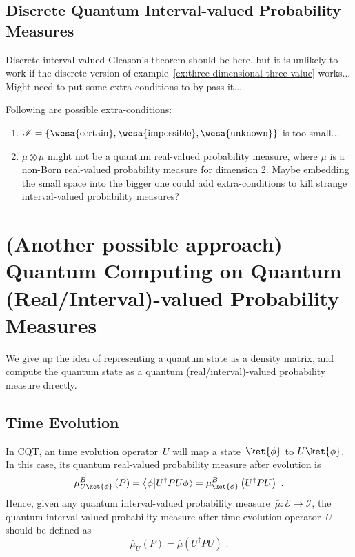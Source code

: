 \documentclass{article}
\theoremstyle{remark}
\newcommand{\events}{\ensuremath{\mathcal{E}}}
\newcommand{\imposs}{{\mbox{\wesa{impossible}}}}
\newcommand{\necess}{{\mbox{\wesa{certain}}}}
\newcommand{\unknown}{{\mbox{\wesa{unknown}}}}
\newcommand{\ip}[2]{\ensuremath{\left\langle{#1}\middle\vert{#2}\right\rangle}}
\begin{document}
\subsection{Discrete Quantum Interval-valued Probability Measures}

Discrete interval-valued Gleason's theorem should be here, but it
is unlikely to work if the discrete version of example~\ref{ex:three-dimensional-three-value}
works... Might need to put some extra-conditions to by-pass it...

Following are possible extra-conditions:
\begin{enumerate}
\item \emph{$\mathscr{I}=\left\{ \necess,\imposs,\unknown\right\} $} is
too small...
\item $\mu\otimes\mu$ might not be a quantum real-valued probability measure,
where $\mu$ is a non-Born real-valued probability measure for dimension
2. Maybe embedding the small space into the bigger one could add extra-conditions
to kill strange interval-valued probability measures?
\end{enumerate}

\section{\label{sec:QC}(Another possible approach) Quantum Computing on Quantum
(Real/Interval)-valued Probability Measures}

We give up the idea of representing a quantum state as a density matrix,
and compute the quantum state as a quantum (real/interval)-valued
probability measure directly. 



\subsection{Time Evolution}

In CQT, an time evolution operator~$U$ will map a state~$\ket{\phi}$
to $U\ket{\phi}$. In this case, its quantum real-valued probability
measure after evolution is
\[
\mu_{U\ket{\phi}}^{B}\left(P\right)=\ip{\phi}{U^{\dagger}PU\phi}=\mu_{\ket{\phi}}^{B}\left(U^{\dagger}PU\right)\textrm{ .}
\]
Hence, given any quantum interval-valued probability measure~$\bar{\mu}:\events\rightarrow\mathscr{I}$,
the quantum interval-valued probability measure after time evolution
operator~$U$ should be defined as 
\[
\bar{\mu}_{U}\left(P\right)=\bar{\mu}\left(U^{\dagger}PU\right)\textrm{ .}
\]
\end{document}
